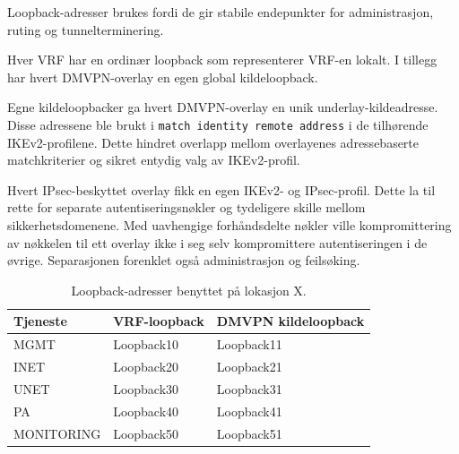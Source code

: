 Loopback-adresser brukes fordi de gir stabile endepunkter for administrasjon, ruting og tunnelterminering.

Hver VRF har en ordinær loopback som representerer VRF-en lokalt. I tillegg har hvert DMVPN-overlay en egen global kildeloopback.

Egne kildeloopbacker ga hvert DMVPN-overlay en unik
underlay-kildeadresse. Disse adressene ble brukt i
\texttt{match identity remote address} i de tilhørende
IKEv2-profilene. Dette hindret overlapp mellom overlayenes
adressebaserte matchkriterier og sikret entydig valg av
IKEv2-profil.

Hvert IPsec-beskyttet overlay fikk en egen IKEv2- og
IPsec-profil. Dette la til rette for separate
autentiseringsnøkler og tydeligere skille mellom
sikkerhetsdomenene. Med uavhengige forhåndsdelte nøkler
ville kompromittering av nøkkelen til ett overlay ikke
i seg selv kompromittere autentiseringen i de øvrige.
Separasjonen forenklet også administrasjon og feilsøking.

\begin{table}[H]
    \centering
    \caption{Loopback-adresser benyttet på lokasjon X.}
    \label{tab:loopback-site-x}
    \small
    \renewcommand{\arraystretch}{1.3}
    \setlength{\tabcolsep}{8pt}
    \begin{tabular}{lll}
        \toprule
        \rowcolor{tablegreen}
        \color{white}\textbf{Tjeneste} &
        \color{white}\textbf{VRF-loopback} &
        \color{white}\textbf{DMVPN kildeloopback} \\
        \midrule
        MGMT       & Loopback10 & Loopback11 \\
        INET       & Loopback20 & Loopback21 \\
        UNET       & Loopback30 & Loopback31 \\
        PA         & Loopback40 & Loopback41 \\
        MONITORING & Loopback50 & Loopback51 \\
        \bottomrule
    \end{tabular}
\end{table}

